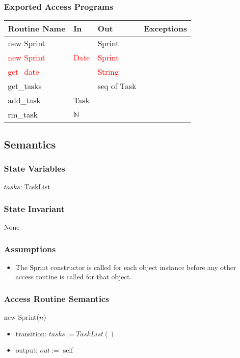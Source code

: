 \documentclass[12pt, titlepage]{article}
\begin{document}
\subsubsection* {Exported Access Programs}
\begin{tabular}{|l|l|l|l|}
    \hline
    \textbf{Routine Name} & \textbf{In} & \textbf{Out} & \textbf{Exceptions} \\
    \hline
    new Sprint & & Sprint & \\
    \hline
    \textcolor{red}{new Sprint} & \textcolor{red}{Date} & \textcolor{red}{Sprint} & \\
    \hline
    \textcolor{red}{get\_date} &  & \textcolor{red}{String} & \\
    \hline
    get\_tasks & & seq of Task &\\
    \hline
    add\_task & Task & & \\
    \hline
    rm\_task & $\mathbb{N}$ & &\\
    \hline
\end{tabular}

\subsection*{Semantics}
\subsubsection*{State Variables}
$tasks$: TaskList

\subsubsection*{State Invariant}
None

\subsubsection*{Assumptions}
\begin{itemize}
  \item The Sprint constructor is called for each object instance before any other access routine is called for that object.
\end{itemize}

\subsubsection*{Access Routine Semantics}
\noindent new Sprint($n$)
\begin{itemize}
    \item transition: $tasks := TaskList()$
    \item output: $out :=$ self
\end{itemize}
\end{document}
